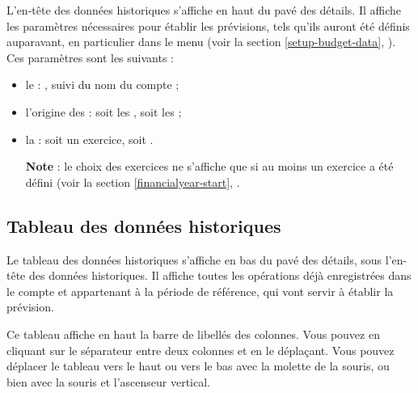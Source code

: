 L'en-tête des données historiques s'affiche en haut du pavé des détails. Il affiche les paramètres nécessaires pour établir les prévisions,  tels qu'ils auront été définis auparavant, en particulier dans le menu  (voir la section \vref{setup-budget-data}, ). Ces paramètres sont les suivants :

\begin{itemize}
	\item le  : , suivi du nom du compte ;
	\item l'origine des  : soit les , soit les  ;
	\item la  : soit un exercice, soit .

	\textbf{Note} : le choix des exercices ne s'affiche que si au moins un exercice a été défini (voir la section \vref{financialyear-start}, .
\end{itemize}


\subsection{Tableau des données historiques\label{budget-data-table}}

Le tableau des données historiques s'affiche en bas du pavé des détails, sous l'en-tête des données historiques. Il affiche toutes les opérations déjà enregistrées dans le compte et appartenant à la période de référence, qui vont servir à établir la prévision.

Ce tableau affiche en haut la barre de libellés des colonnes. Vous pouvez  en cliquant sur le séparateur entre deux colonnes et en le déplaçant. Vous pouvez déplacer le tableau vers le haut ou vers le bas avec la molette de la souris, ou bien avec la souris et l'ascenseur vertical. 


